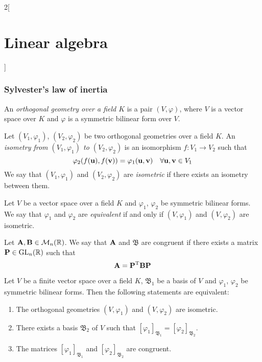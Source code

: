 \documentclass[../../../main.tex]{subfiles}
\begin{document}
\begin{multicols}{2}[\section{Linear algebra}]
  \subsubsection{Sylvester's law of inertia}
  \begin{definition}
    An \textit{orthogonal geometry over a field $K$} is a pair $(V,\varphi)$, where $V$ is a vector space over $K$ and $\varphi$ is a symmetric bilinear form over $V$.
  \end{definition}
  \begin{definition}\label{isometry}
    Let $(V_1,\varphi_1)$, $(V_2,\varphi_2)$ be two orthogonal geometries over a field $K$. An \textit{isometry from $(V_1,\varphi_1)$ to $(V_2,\varphi_2)$} is an isomorphism $f:V_1\rightarrow V_2$ such that $$\varphi_2(f(\boldsymbol{\mathrm{u}}),f(\boldsymbol{\mathrm{v}}))=\varphi_1(\boldsymbol{\mathrm{u}},\boldsymbol{\mathrm{v}})\quad\forall\boldsymbol{\mathrm{u}},\boldsymbol{\mathrm{v}}\in V_1$$ We say that $(V_1,\varphi_1)$ and $(V_2,\varphi_2)$ are \textit{isometric} if there exists an isometry between them.
  \end{definition}
  \begin{definition}
    Let $V$ be a vector space over a field $K$ and $\varphi_1$, $\varphi_2$ be symmetric bilinear forms. We say that $\varphi_1$ and $\varphi_2$ are \textit{equivalent} if and only if $(V,\varphi_1)$ and $(V,\varphi_2)$ are isometric.
  \end{definition}
  \begin{definition}
    Let $\boldsymbol{\mathrm{A}},\boldsymbol{\mathrm{B}}\in\mathcal{M}_n(\mathbb{R})$. We say that $\boldsymbol{\mathrm{A}}$ and $\mathfrak{B}$ are congruent if there exists a matrix $\boldsymbol{\mathrm{P}}\in\mathrm{GL}_n(\mathbb{R})$ such that $$\boldsymbol{\mathrm{A}}=\vb{P}^{\mathrm{T}}\boldsymbol{\mathrm{B}}\boldsymbol{\mathrm{P}}$$
  \end{definition}
  \begin{prop}
    Let $V$ be a finite vector space over a field $K$, $\mathfrak{B}_1$ be a basis of $V$ and $\varphi_1$, $\varphi_2$ be symmetric bilinear forms. Then the following statements are equivalent:
    \begin{enumerate}
      \item The orthogonal geometries $(V,\varphi_1)$ and $(V,\varphi_2)$ are isometric.
      \item There exists a basis $\mathfrak{B}_2$ of $V$ such that $[\varphi_1]_{\mathfrak{B}_1}=[\varphi_2]_{\mathfrak{B}_2}$.
      \item The matrices $[\varphi_1]_{\mathfrak{B}_1}$ and $[\varphi_2]_{\mathfrak{B}_2}$ are congruent.

\end{enumerate}
\end{prop}
\end{multicols}
\end{document}
